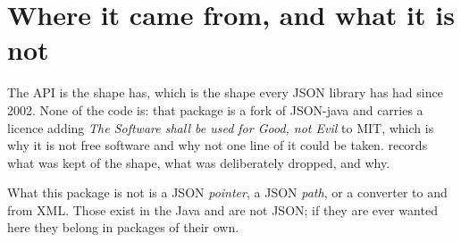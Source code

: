 \section{Where it came from, and what it is not}

The API is the shape  has, which is the shape every JSON
library has had since 2002. None of the code is: that package is a fork of
JSON-java and carries a licence adding \emph{The Software shall be used for
Good, not Evil} to MIT, which is why it is not free software and why not one
line of it could be taken.  records what was kept
of the shape, what was deliberately dropped, and why.

What this package is not is a JSON \emph{pointer}, a JSON \emph{path}, or a
converter to and from XML. Those exist in the Java and are not JSON; if they
are ever wanted here they belong in packages of their own.
